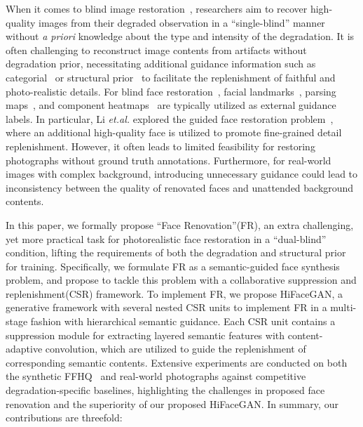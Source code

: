 \documentclass[sigconf]{acmart}
\begin{document}
When it comes to blind image restoration~\cite{BIR_original}, researchers aim to recover high-quality images from their degraded observation in a ``single-blind'' manner without \emph{a priori} knowledge about the type and intensity of the degradation. It is often challenging to reconstruct image contents from artifacts without degradation prior, necessitating additional guidance information such as categorial~\cite{CategorySpecificID} or structural prior~\cite{FSRNet} to facilitate the replenishment of faithful and photo-realistic details. For blind face restoration~\cite{MultiScaleFR-AAAI2018}\cite{SGEN}, facial landmarks~\cite{SuperFAN}, parsing maps~\cite{pix2pixHD}, and component heatmaps~\cite{faceSR_ECCV2018} are typically utilized as external guidance labels. In particular, Li \emph{et.al.} explored the guided face restoration problem~\cite{BlindFR-ECCV2018}\cite{EnhancedBlindFR-CVPR2020}, where an additional high-quality face is utilized to promote fine-grained detail replenishment. However, it often leads to limited feasibility for restoring photographs without ground truth annotations. Furthermore, for real-world images with complex background, introducing unnecessary guidance could lead to inconsistency between the quality of renovated faces and unattended background contents.





In this paper, we formally propose ``Face Renovation''(FR), an extra challenging, yet more practical task for photorealistic face restoration in a ``dual-blind'' condition, lifting the requirements of both the degradation and structural prior for training. Specifically, we formulate FR as a semantic-guided face synthesis problem, and propose to tackle this problem with a collaborative suppression and replenishment(CSR) framework. To implement FR, we propose HiFaceGAN, a generative framework with several nested CSR units to implement FR in a multi-stage fashion with hierarchical semantic guidance. Each CSR unit contains a suppression module for extracting layered semantic features with content-adaptive convolution, which are utilized to guide the replenishment of corresponding semantic contents. Extensive experiments are conducted on both the synthetic FFHQ~\cite{stylegan_ffhq} and real-world photographs against competitive degradation-specific baselines, highlighting the challenges in proposed face renovation and the superiority of our proposed HiFaceGAN. In summary, our contributions are threefold:
\end{document}
